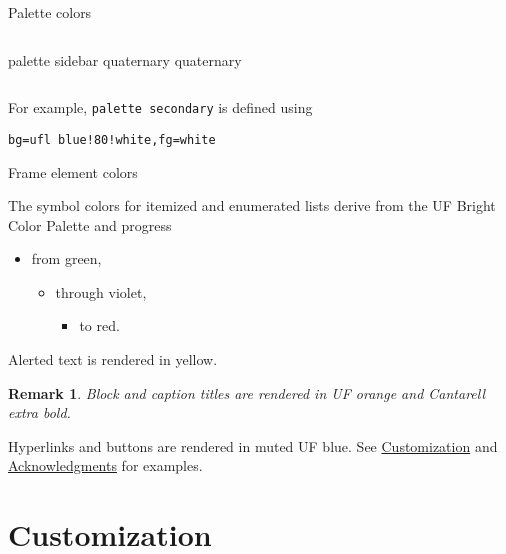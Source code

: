\documentclass{beamer}
\newtheorem{remark}{Remark}
\begin{document}
\begin{frame}[fragile]{Palette colors}
\begin{columns}
\begin{column}{.5\textwidth}
\begin{beamercolorbox}[sep=4pt,center]{palette sidebar quaternary}
quaternary
\end{beamercolorbox}

\end{column}
\end{columns}

\vspace{2ex}
For example, \verb|palette secondary| is defined using
\begin{verbatim}
bg=ufl blue!80!white,fg=white
\end{verbatim}

\end{frame}


\begin{frame}{Frame element colors}

The symbol colors for itemized and enumerated lists derive from the UF Bright Color Palette and progress
\begin{itemize}
\item from green,
\begin{itemize}
\item through violet,
\begin{itemize}
\item to red.
\end{itemize}
\end{itemize}
\end{itemize}
\alert{Alerted text is rendered in yellow.}

\vfill\begin{remark}
Block and caption titles are rendered in UF orange and Cantarell extra bold.
\end{remark}

\vfill
Hyperlinks and buttons are rendered in muted UF blue.
See \hyperlink{sec:customization}{Customization} and \hyperlink{slide:acknowledgments}{Acknowledgments} for examples.

\end{frame}


\section{Customization}
\label{sec:customization}
\end{document}

